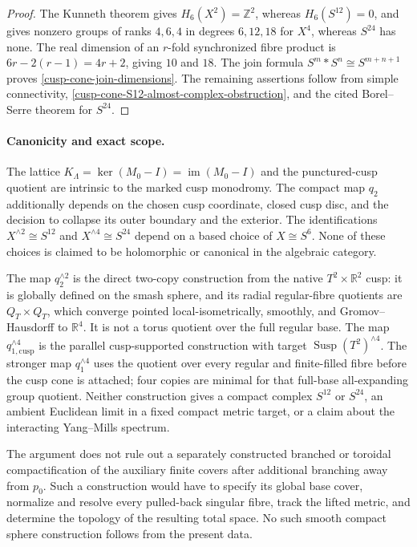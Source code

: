 \begin{proof}
The Kunneth theorem gives \(H_6(X^2)=\mathbb Z^2\), whereas
\(H_6(S^{12})=0\), and gives nonzero groups of ranks \(4,6,4\) in degrees
\(6,12,18\) for \(X^4\), whereas \(S^{24}\) has none.  The real dimension
of an \(r\)-fold synchronized fibre product is
\(6r-2(r-1)=4r+2\), giving \(10\) and \(18\).  The join formula
\(S^m*S^n\cong S^{m+n+1}\) proves
\cref{cusp-cone-join-dimensions}.  The remaining assertions follow from
simple connectivity, \cref{cusp-cone-S12-almost-complex-obstruction}, and
the cited Borel--Serre theorem for \(S^{24}\).
\end{proof}

\paragraph{Canonicity and exact scope.}
The lattice \(K_\Lambda=\ker(M_0-I)=\operatorname{im}(M_0-I)\) and the
punctured-cusp quotient are intrinsic to the marked cusp monodromy.
The compact map \(q_2\) additionally depends on the chosen cusp coordinate,
closed cusp disc, and the decision to collapse its outer boundary and the
exterior.  The identifications
\(X^{\wedge2}\cong S^{12}\) and \(X^{\wedge4}\cong S^{24}\) depend on a
based choice of \(X\cong S^6\).  None of these choices is claimed to be
holomorphic or canonical in the algebraic category.

The map \(q_2^{\wedge2}\) is the direct two-copy construction from the
native \(T^2\times\mathbb R^2\) cusp: it is globally defined on the smash
sphere, and its radial regular-fibre quotients are \(Q_T\times Q_T\), which
converge pointed local-isometrically, smoothly, and Gromov--Hausdorff to
\(\mathbb R^4\).  It is not a torus quotient over the full
regular base.  The map \(q_{1,\mathrm{cusp}}^{\wedge4}\) is the parallel
cusp-supported construction with target
\(\operatorname{Susp}(T^2)^{\wedge4}\).  The stronger map
\(q_1^{\wedge4}\) uses the quotient over every regular and finite-filled
fibre before the cusp cone is attached; four copies are minimal for that
full-base all-expanding group quotient.
Neither construction gives a compact complex \(S^{12}\) or \(S^{24}\), an
ambient Euclidean limit in a fixed compact metric target, or a claim about
the interacting Yang--Mills spectrum.

The argument does not rule out a separately constructed branched or
toroidal compactification of the auxiliary finite covers after additional
branching away from \(p_0\).  Such a construction would have to specify its
global base cover, normalize and resolve every pulled-back singular fibre,
track the lifted metric, and determine the topology of the resulting total
space.  No such smooth compact sphere construction follows from the present
data.

